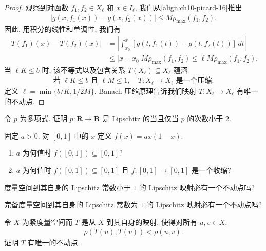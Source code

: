 \documentclass[../../main.tex]{subfiles}
\begin{document}
\begin{proof}
观察到对函数 $f_{1},f_{2}\in X_{\ell}$ 和 $x\in I_{\ell}$, 我们从\eqref{align:ch10-picard-16}推出
\begin{align*}
|g(x,f_{1}(x))-g(x,f_{2}(x))|\leqslant M\rho_{\max}(f_{1},f_{2}).
\end{align*}
因此, 用积分的线性和单调性, 我们有
\begin{align*}
|T(f_{1})(x)-T(f_{2})(x)|&=\left|\int_{x_{0}}^{x}[g(t,f_{1}(t))-g(t,f_{2}(t))]\,dt\right|\\
&\leqslant|x-x_{0}|M\rho_{\max}(f_{1},f_{2})\leqslant\ell M\rho_{\max}(f_{1},f_{2}).
\end{align*}
当 $\ell K\leqslant b$ 时, 该不等式以及包含关系 $T(X_{\ell})\subseteq X_{\ell}$ 蕴涵
\begin{align*}
\text{若 }\ell K\leqslant b\text{ 且 }\ell M\leqslant 1,\quad T:X_{\ell}\to X_{\ell}\text{ 是一个压缩}.
\end{align*}
定义 $\ell=\min\{b/K,1/2M\}$. Banach 压缩原理告诉我们映射 $T:X_{\ell}\to X_{\ell}$ 有唯一的不动点.
\end{proof}

\begin{exercise}\label{exercise:ch10-29}
令 $p$ 为多项式. 证明 $p:\mathbf{R}\to\mathbf{R}$ 是 Lipschitz 的当且仅当 $p$ 的次数小于 $2$.
\end{exercise}

\begin{exercise}\label{exercise:ch10-30}
固定 $a>0$. 对 $[0,1]$ 中的 $x$ 定义 $f(x)=ax(1-x)$.
\begin{enumerate}[(1)]
\item $a$ 为何值时 $f([0,1])\subseteq[0,1]$?
\item $a$ 为何值时 $f([0,1])\subseteq[0,1]$ 且 $f:[0,1]\to[0,1]$ 是一个收缩?
\end{enumerate}
\end{exercise}

\begin{exercise}\label{exercise:ch10-31}
度量空间到其自身的 Lipschitz 常数小于 $1$ 的 Lipschitz 映射必有一个不动点吗?
\end{exercise}

\begin{exercise}\label{exercise:ch10-32}
完备度量空间到其自身的 Lipschitz 常数为 $1$ 的 Lipschitz 映射必有一个不动点吗?
\end{exercise}

\begin{exercise}\label{exercise:ch10-33}
令 $X$ 为紧度量空间而 $T$ 是从 $X$ 到其自身的映射, 使得对所有 $u,v\in X$,
\begin{align*}
\rho(T(u),T(v))<\rho(u,v).
\end{align*}
证明 $T$ 有唯一的不动点.
\end{exercise}
\end{document}
